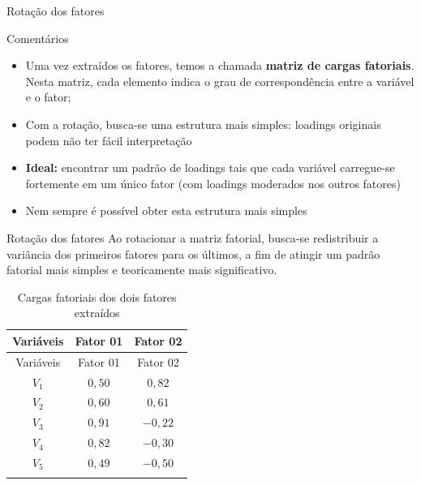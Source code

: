 \documentclass[
  ignorenonframetext,
  aspectratio=169,
]{beamer}
\providecommand{\tightlist}{%
  \setlength{\itemsep}{0pt}\setlength{\parskip}{0pt}}
\begin{document}
\begin{frame}{Rotação dos fatores}
\label{rotauxe7uxe3o-dos-fatores-1}
\begin{block}{Comentários}
\label{comentuxe1rios}
\begin{itemize}
\tightlist
\item
  Uma vez extraídos os fatores, temos a chamada \textbf{matriz de cargas
  fatoriais}. Nesta matriz, cada elemento indica o grau de
  correspondência entre a variável e o fator;
\end{itemize}

\vspace{0.3cm}

\begin{itemize}
\tightlist
\item
  Com a rotação, busca-se uma estrutura mais simples: loadings originais
  podem não ter fácil interpretação
\end{itemize}

\vspace{0.3cm}

\begin{itemize}
\tightlist
\item
  \textbf{Ideal:} encontrar um padrão de loadings tais que cada variável
  carregue-se fortemente em um único fator (com loadings moderados nos
  outros fatores)
\end{itemize}

\vspace{0.3cm}

\begin{itemize}
\tightlist
\item
  Nem sempre é possível obter esta estrutura mais simples
\end{itemize}
\end{block}
\end{frame}

\begin{frame}{Rotação dos fatores}
\label{rotauxe7uxe3o-dos-fatores-2}
Ao rotacionar a matriz fatorial, busca-se redistribuir a variância dos
primeiros fatores para os últimos, a fim de atingir um padrão fatorial
mais simples e teoricamente mais significativo.

\begin{longtable}[]{@{}ccc@{}}
\caption{Cargas fatoriais dos dois fatores
extraídos}\label{tbl-fatores}\tabularnewline
\toprule\noalign{}
Variáveis & Fator 01 & Fator 02 \\
\midrule\noalign{}
\endfirsthead
\toprule\noalign{}
Variáveis & Fator 01 & Fator 02 \\
\midrule\noalign{}
\endhead
\(V_1\) & \(0,50\) & \(0,82\) \\
\(V_2\) & \(0,60\) & \(0,61\) \\
\(V_3\) & \(0,91\) & \(-0,22\) \\
\(V_4\) & \(0,82\) & \(-0,30\) \\
\(V_5\) & \(0,49\) & \(-0,50\) \\
\bottomrule\noalign{}
\end{longtable}
\end{frame}
\end{document}
